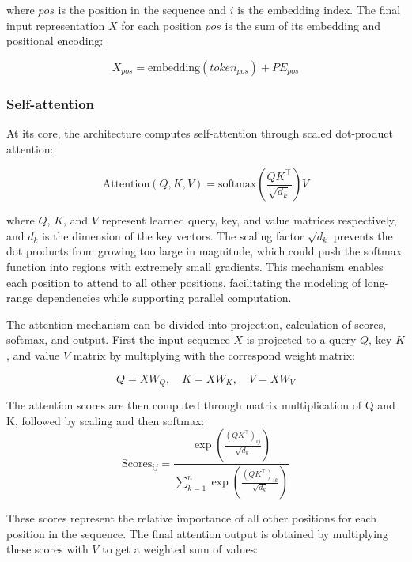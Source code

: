 where $pos$ is the position in the sequence and $i$ is the embedding index. The final input representation $X$ for each position $pos$ is the sum of its embedding and positional encoding:

\begin{equation}
X_{pos} = \text{embedding}(token_{pos}) + PE_{pos}
\end{equation}

\subsubsection{Self-attention}
At its core, the architecture computes self-attention through scaled dot-product attention:

\begin{equation}
\text{Attention}(Q, K, V) = \text{softmax}\left(\frac{QK^\top}{\sqrt{d_k}}\right)V \label{eq:attention}
\end{equation}

where $Q$, $K$, and $V$ represent learned query, key, and value matrices respectively, and $d_k$ is the dimension of the key vectors. The scaling factor $\sqrt{d_k}$ prevents the dot products from growing too large in magnitude, which could push the softmax function into regions with extremely small gradients. This mechanism enables each position to attend to all other positions, facilitating the modeling of long-range dependencies while supporting parallel computation.

The attention mechanism can be divided into projection, calculation of scores, softmax, and output. First the input sequence $X$ is projected to a query $Q$, key $K$, and value $V$ matrix by multiplying with the correspond weight matrix:

\begin{equation}
    Q = XW_Q, \quad K = XW_K, \quad V = XW_V
\end{equation}


The attention scores are then computed through matrix multiplication of Q and K, followed by scaling and then softmax:
\begin{equation}
    \text{Scores}_{ij} = \frac{\exp\left(\frac{(QK^\top)_{ij}}{\sqrt{d_k}}\right)}{\sum_{k=1}^n \exp\left(\frac{(QK^\top)_{ik}}{\sqrt{d_k}}\right)}
\end{equation}

These scores represent the relative importance of all other positions for each position in the sequence. The final attention output is obtained by multiplying these scores with $V$ to get a weighted sum of values:

